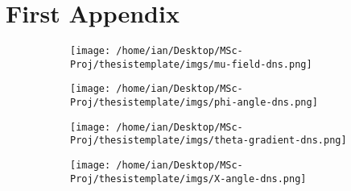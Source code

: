 \chapter{First Appendix} \label{ch:appendix1}



\begin{figure}[ht]
\begin{subfigure}{.5\textwidth}
  \centering
  \texttt{[image: /home/ian/Desktop/MSc-Proj/thesistemplate/imgs/mu-field-dns.png]}
  \caption{}
  \label{fig:sub111}
\end{subfigure}
\begin{subfigure}{.5\textwidth}
  \centering
  \texttt{[image: /home/ian/Desktop/MSc-Proj/thesistemplate/imgs/phi-angle-dns.png]}
  \caption{}
  \label{fig:sub222}
\end{subfigure}
\caption{}
\label{fig:test}
\end{figure}

\begin{figure}[ht]
\begin{subfigure}{.5\textwidth}
  \centering
  \texttt{[image: /home/ian/Desktop/MSc-Proj/thesistemplate/imgs/theta-gradient-dns.png]}
  \caption{}
  \label{fig:sub1}
\end{subfigure}
\begin{subfigure}{.5\textwidth}
  \centering
  \texttt{[image: /home/ian/Desktop/MSc-Proj/thesistemplate/imgs/X-angle-dns.png]}
  \caption{}
  \label{fig:sub2}
\end{subfigure}
\caption{}
\label{fig:test}

\end{figure}